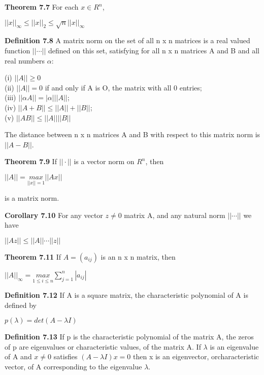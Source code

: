 \documentclass{article}
\begin{document}
\textbf {Theorem 7.7} For each $x \in R^n$,
\begin{center}
$||x||_\infty \leq ||x||_2 \leq \sqrt{n} ||x||_\infty$
\end{center}

\textbf {Definition 7.8} A matrix norm on the set of all n x n matrices is a real valued function $|| \cdots ||$ defined on this set, satisfying for all n x n matrices A and B and all real numbers $\alpha$:
\begin{center}
(i) $||A|| \geq 0$ \\
(ii) $||A|| = 0$ if and only if A is O, the matrix with all 0 entries; \\
(iii) $||\alpha A|| = |\alpha| ||A||$; \\
(iv) $||A + B|| \leq ||A|| + ||B||$; \\
(v) $||AB|| \leq ||A|| ||B||$

\end{center}
The distance between n x n matrices A and B with respect to this matrix norm is $||A-B||$.

\textbf {Theorem 7.9} If $|| \cdot ||$ is a vector norm on $R^n$, then
\begin{center}
$||A|| = \underset{||x||=1}{max} ||Ax||$
\end{center}
is a matrix norm.

\textbf {Corollary 7.10} For any vector $z \neq 0 $ matrix A, and any natural norm $|| \cdots ||$ we have
\begin{center}
$||Az|| \leq ||A|| \cdots ||z||$
\end{center}

\textbf {Theorem 7.11} If $A = (a_{ij})$ is an n x n matrix, then
\begin{center}
$||A||_\infty = \underset {1 \leq i \leq n}{max} \sum_{j=1}^n |a_{ij}|$
\end{center}

\textbf {Definition 7.12} If A is a square matrix, the characteristic polynomial of A is defined by 
\begin{center}
$p(\lambda) = det(A - \lambda I)$
\end{center}

\textbf {Definition 7.13} If p is the characteristic polynomial of the matrix A, the zeros of p are eigenvalues or characteristic values, of the matrix A. If $\lambda$ is an eigenvalue of A and $x \neq 0$ satisfies $(A-\lambda I) x = 0$ then x is an eigenvector, orcharacteristic vector, of A corresponding to the eigenvalue $\lambda$.
\end{document}
